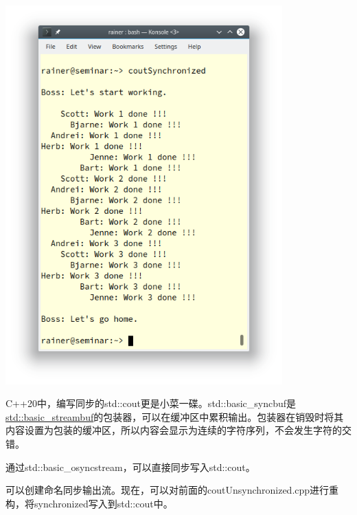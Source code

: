 \begin{center}
\includegraphics[width=0.8\textwidth]{content/3/chapter6/images/30.png}\\
\end{center}

C++20中，编写同步的std::cout更是小菜一碟。std::basic\_syncbuf是\href{https://en.cppreference.com/w/cpp/io/basic_streambuf}{std::basic\_streambuf}的包装器，可以在缓冲区中累积输出。包装器在销毁时将其内容设置为包装的缓冲区，所以内容会显示为连续的字符序列，不会发生字符的交错。

通过std::basic\_osyncstream，可以直接同步写入std::cout。

可以创建命名同步输出流。现在，可以对前面的coutUnsynchronized.cpp进行重构，将synchronized写入到std::cout中。

